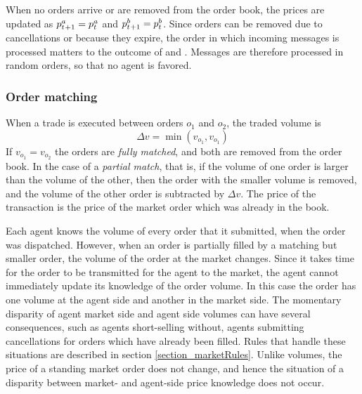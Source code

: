 When no orders arrive or are removed from the order book, the prices are updated as $\pask[ + 1] = \pask$ and $\pbid[ + 1] = \pbid$. Since orders can be removed due to cancellations or because they expire, the order in which incoming messages is processed matters to the outcome of \pask{} and \pbid. Messages are therefore processed in random orders, so that no agent is favored.



\subsubsection{Order matching}\label{section:order_matching}
When a trade is executed between orders $o_1$ and $o_2$, the traded volume is 
\begin{equation}
\Delta v = \min (v_{o_1}, v_{o_1}) \nonumber
\end{equation}
If $v_{o_1} = v_{o_2}$ the orders are \textit{fully matched}, and both are removed from the order book. In the case of a \textit{partial match}, that is, if the volume of one order is larger than the volume of the other, then the order with the smaller volume is removed, and the volume of the other order is subtracted by $\Delta v$. The price of the transaction is the price of the market order which was already in the book. 

Each agent knows the volume of every order that it submitted, when the order was dispatched. However, when an order is partially filled by a matching but smaller order, the volume of the order at the market changes. Since it takes time for the order to be transmitted for the agent to the market, the agent cannot immediately update its knowledge of the order volume. In this case the order has one volume at the agent side and another in the market side. The momentary disparity of agent market side and agent side volumes can have several consequences, such as agents short-selling without, agents submitting cancellations for orders which have already been filled. Rules that handle these situations are described in section \ref{section_marketRules}. Unlike volumes, the price of a standing market order does not change, and hence the situation of a disparity between market- and agent-side price knowledge does not occur.




